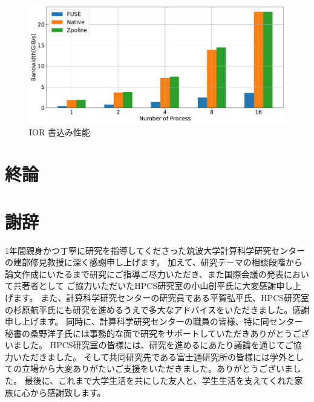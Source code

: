 \documentclass[a4paper,11pt]{jreport}
\begin{document}
\begin{figure}[h]
    \begin{minipage}[b]{1\columnwidth}
		\centering
		\includegraphics[width=0.9\linewidth]{./figure/ior_benchmark_write.pdf}
		\caption{IOR 書込み性能}
		\label{fig:Evaluation write}
	\end{minipage}
\end{figure}

\chapter{終論}

\chapter*{謝辞}
1年間親身かつ丁寧に研究を指導してくださった筑波大学計算科学研究センターの建部修見教授に深く感謝申し上げます。
加えて、研究テーマの相談段階から論文作成にいたるまで研究にご指導ご尽力いただき、また国際会議の発表において共著者として
ご協力いただいたHPCS研究室の小山創平氏に大変感謝申し上げます。
また、計算科学研究センターの研究員である平賀弘平氏、HPCS研究室の杉原航平氏にも研究を進めるうえで多大なアドバイスをいただきました。感謝申し上げます。
同時に、計算科学研究センターの職員の皆様、特に同センター秘書の桑野洋子氏には事務的な面で研究をサポートしていただきありがとうございました。
HPCS研究室の皆様には、研究を進めるにあたり議論を通じてご協力いただきました。
そして共同研究先である富士通研究所の皆様には学外としての立場から大変ありがたいご支援をいただきました。ありがとうございました。
最後に、これまで大学生活を共にした友人と、学生生活を支えてくれた家族に心から感謝致します。

\newpage

\renewcommand{\bibname}{参考文献}



\end{document}
